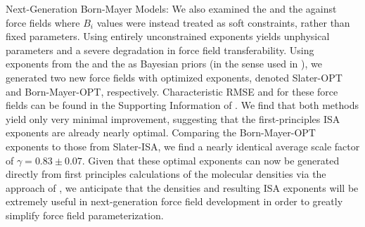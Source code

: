\begin{subsection}{Next-Generation Born-Mayer Models: \bmsisaff}
We also examined the \isaffold and the \bmsisaff against force
fields where $B_i$ values were instead treated as soft constraints, rather than fixed parameters.
Using entirely unconstrained exponents yields unphysical parameters and a 
severe degradation in force field transferability. Using exponents from the \isaffold and
the \bmsisaff as Bayesian priors (in the sense used in
), 
we generated two new force fields with optimized exponents, denoted Slater-OPT and Born-Mayer-OPT,
respectively. Characteristic RMSE and \mse for these force fields can be found
in the Supporting Information of .
We find that both methods yield only very minimal improvement, suggesting that the
first-principles ISA exponents are already nearly optimal. Comparing the Born-Mayer-OPT
exponents to those from Slater-ISA, we find a nearly identical average scale factor
of $\gamma = 0.83 \pm 0.07$.  Given that these optimal exponents can now be generated
directly from first principles calculations of the molecular densities via the \bsisa 
approach of \citeauthor{Misquitta2014}, we anticipate that the \bsisa densities and
resulting ISA exponents will be extremely useful in next-generation force field
development in order to greatly simplify force field parameterization.

\end{subsection}
